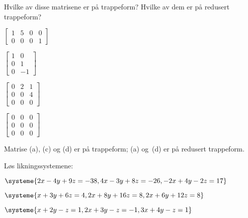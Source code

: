 

\begin{oppgave}
Hvilke av disse matrisene er på trappeform?  Hvilke av dem er på
redusert trappeform?
\begin{punkt}
$
\begin{bmatrix}
1 & 5 & 0 & 0 \\
0 & 0 & 0 & 1
\end{bmatrix}
$
\end{punkt}
\begin{punkt}
$
\begin{bmatrix}
1 & 0 \\
0 & 1 \\
0 & -1
\end{bmatrix}
$
\end{punkt}
\begin{punkt}
$
\begin{bmatrix}
0 & 2 & 1 \\
0 & 0 & 4 \\
0 & 0 & 0
\end{bmatrix}
$
\end{punkt}
\begin{punkt}
$
\begin{bmatrix}
0 & 0 & 0 \\
0 & 0 & 0 \\
0 & 0 & 0
\end{bmatrix}
$
\end{punkt}
\end{oppgave}
\begin{losning}
Matrise (a), (c) og (d) er på trappeform;
(a) og~(d) er på redusert trappeform.
\end{losning}

\begin{oppgave}
Løs likningssystemene:
\begin{punkt}
$
\systeme{
  2x - 4y + 9z = -38,
  4x - 3y + 8z = -26,
 -2x + 4y - 2z =  17
}
$
\end{punkt}
\begin{punkt}
$
\systeme{
  x + 3y +  6z = 4,
 2x + 8y + 16z = 8,
 2x + 6y + 12z = 8
}
$
\end{punkt}
\begin{punkt}
$
\systeme{
	x  + 2y - z = 1,
	2x + 3y - z = -1,
	3x + 4y - z = 1
}
$
\end{punkt}
\end{oppgave}


